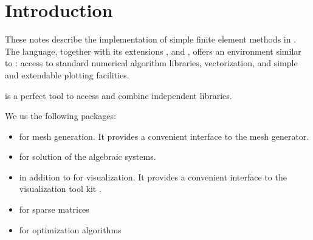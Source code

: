 %
\section{Introduction}\label{sec:introduction}
%
These notes describe the implementation of simple finite element methods in . The language, together with its extensions ,  and , offers an environment similar to : access to standard numerical algorithm libraries, vectorization, and simple and extendable plotting facilities.

 is a perfect tool to access and combine independent libraries.

We us the following packages:
\begin{itemize}
\item {} for mesh generation. It provides a convenient interface to the  mesh generator.
\item {} for solution of the algebraic systems.
\item {} in addition to  for visualization. It provides a convenient interface to the visualization tool kit .
\item {} for sparse matrices
\item {} for optimization algorithms
\end{itemize}
%
